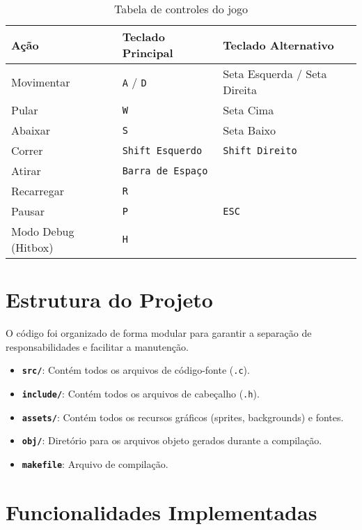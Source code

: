 \documentclass[11pt, a4paper]{article}
\begin{document}
\begin{table}[h!]
\centering
\begin{tabular}{|l|l|l|}
\hline
\textbf{Ação} & \textbf{Teclado Principal} & \textbf{Teclado Alternativo} \\ \hline
Movimentar & \texttt{A} / \texttt{D} & Seta Esquerda / Seta Direita \\
Pular & \texttt{W} & Seta Cima \\
Abaixar & \texttt{S} & Seta Baixo \\
Correr & \texttt{Shift Esquerdo} & \texttt{Shift Direito} \\
Atirar & \texttt{Barra de Espaço} & \\
Recarregar & \texttt{R} & \\
Pausar & \texttt{P} & \texttt{ESC} \\
Modo Debug (Hitbox) & \texttt{H} & \\ \hline
\end{tabular}
\caption{Tabela de controles do jogo}
\label{tab:controles}
\end{table}

\section{Estrutura do Projeto}
O código foi organizado de forma modular para garantir a separação de responsabilidades e facilitar a manutenção.

\begin{itemize}
    \item \textbf{\texttt{src/}}: Contém todos os arquivos de código-fonte (\texttt{.c}).
    \item \textbf{\texttt{include/}}: Contém todos os arquivos de cabeçalho (\texttt{.h}).
    \item \textbf{\texttt{assets/}}: Contém todos os recursos gráficos (sprites, backgrounds) e fontes.
    \item \textbf{\texttt{obj/}}: Diretório para os arquivos objeto gerados durante a compilação.
    \item \textbf{\texttt{makefile}}: Arquivo de compilação.
\end{itemize}

\section{Funcionalidades Implementadas}
\end{document}

